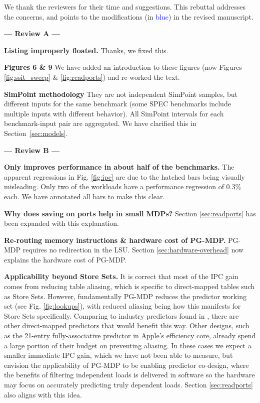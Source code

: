 We thank the reviewers for their time and suggestions. This rebuttal addresses the concerns, and points to the modifications (in \textcolor{blue}{blue}) in the revised manuscript.

\vspace{-0.2cm}
\begin{center}
\textbf{--- Review A ---}
\end{center}
\vspace{-0.2cm}

 \textbf{Listing improperly floated.} Thanks, we fixed this.

 \textbf{Figures 6 \& 9} We have added an introduction to these figures (now Figures \ref{fig:ssit_sweep} \& \ref{fig:readports}) and re-worked the text.

 \textbf{SimPoint methodology} They are not independent SimPoint samples, but different inputs for the same benchmark (some SPEC benchmarks include multiple inputs with different behavior). All SimPoint intervals for each benchmark-input pair are aggregated. We have clarified this in Section~\ref{sec:models}.

\vspace{-0.2cm}
\begin{center}
\textbf{--- Review B ---}
\end{center}
\vspace{-0.2cm}

 \textbf{Only improves performance in about half of the benchmarks.} The apparent regressions in Fig. \ref{fig:ipc} are due to the hatched bars being visually misleading. Only two of the workloads have a performance regression of 0.3\% each. We have annotated all bars to make this clear.

 \textbf{Why does saving on ports help in small MDPs?} Section \ref{sec:readports} has been expanded with this explanation.

 \textbf{Re-routing memory instructions \& hardware cost of PG-MDP.} PG-MDP requires no redirection in the LSU. Section \ref{sec:hardware-overhead} now explains the hardware cost of PG-MDP.

 \textbf{Applicability beyond Store Sets.} It is correct that most of the IPC gain comes from reducing table aliasing, which is specific to direct-mapped tables such as Store Sets. However, fundamentally PG-MDP reduces the predictor working set (see Fig. \ref{fig:lookups}), with reduced aliasing being how this manifests for Store Sets specifically. Comparing to industry predictors found in \cite{ssbench}, there are other direct-mapped predictors that would benefit this way. Other designs, such as the 21-entry fully-associative predictor in Apple's efficiency core, already spend a large portion of their budget on preventing aliasing. In these cases we expect a smaller immediate IPC gain, which we have not been able to measure, but envision the applicability of PG-MDP to be enabling predictor co-design, where the benefits of filtering independent loads is delivered in software so the hardware may focus on accurately predicting truly dependent loads. Section \ref{sec:readports} also aligns with this idea.

